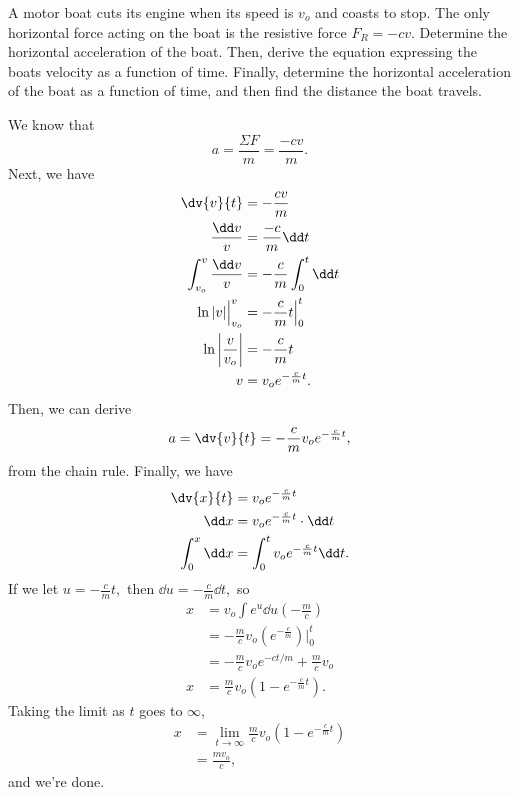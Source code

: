 \documentclass[11pt]{article}
\begin{document}
\begin{example}
	A motor boat cuts its engine when its speed is $v_o$ and coasts to stop. The only horizontal force acting on the boat is the resistive force $F_R = -cv$. Determine the horizontal acceleration of the boat. Then, derive the equation expressing the boats velocity as a function of time. Finally, determine the horizontal acceleration of the boat as a function of time, and then find the distance the boat travels.
\end{example}
\begin{solution}
	We know that
	\[a = \frac{\Sigma F}{m} = \frac{-cv}{m}.\]
	Next, we have
	\begin{align*}
		\dv{v}{t} &= -\frac{cv}{m} \\
		\frac{\dd v}{v} &= \frac{-c}{m}\dd t \\
		\int_{v_o}^{v} \frac{\dd v}{v} &= -\frac{c}{m}\int_{0}^t \dd t \\
		\ln|v|\Big|_{v_o}^v &= -\frac{c}{m}t\Big|_0^t \\
		\ln\left|\frac{v}{v_o}\right| &= -\frac{c}{m}t \\
		v &= v_oe^{-\frac{c}{m}t}.
	\end{align*}
	Then, we can derive
	\begin{align*}
		a = \dv{v}{t} = -\frac{c}{m}v_oe^{-\frac{c}{m}t},
	\end{align*}
	from the chain rule. Finally, we have
	\begin{align*}
		\dv{x}{t} &= v_oe^{-\frac{c}{m}t} \\
		\dd x &= v_oe^{-\frac{c}{m}t} \cdot \dd t \\
		\int_0^x \dd x &= \int_0^t v_oe^{-\frac{c}{m}t} \dd t.
	\end{align*}
	If we let $u = -\frac{c}{m}t,$ then $\dd u = -\frac{c}{m}\dd t,$ so
	\begin{align*}
		x &= v_o \int e^{u} \dd u \left(-\frac{m}{c}\right) \\
		&= -\frac{m}{c}v_o\left(e^{-\frac{c}{m}}\right)\Big|_0^t \\
		&= -\frac{m}{c}v_o e^{-ct/m} + \frac{m}{c}v_o \\
		x &= \frac{m}{c}v_o\left(1 - e^{-\frac{c}{m}t}\right).
	\end{align*}
	Taking the limit as $t$ goes to $\infty$,
	\begin{align*}
		x &= \lim_{t \to \infty} \frac{m}{c}v_o\left(1 - e^{-\frac{c}{m}t}\right) \\
		&= \boxed{\frac{mv_o}{c}},
	\end{align*}
	and we're done.
\end{solution}
\end{document}
